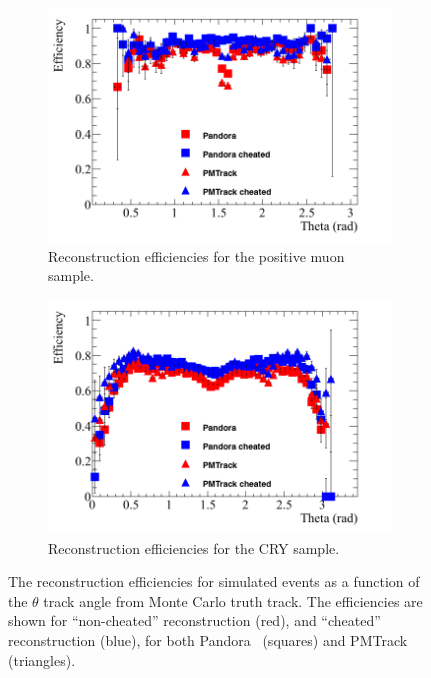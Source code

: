 \begin{figure}
  \centering
  \begin{subfigure}{0.48\textwidth}
    \centering
    \includegraphics[width=\textwidth]{Effic_AntiMuon_500V_All_Theta}
    \caption{Reconstruction efficiencies for the positive muon sample.}
    \label{fig:SimEffic_Theta_AMu}
  \end{subfigure}%
  \hspace{0.03\textwidth}%
  \begin{subfigure}{0.48\textwidth}
    \centering
    \includegraphics[width=\textwidth]{Effic_Cosmics_500V_All_Theta}
    \caption{Reconstruction efficiencies for the CRY sample.}
    \label{fig:SimEffic_Theta_CRY}
  \end{subfigure}
  \caption[The reconstruction efficiencies for simulated events as a function of the $\theta$ track angle from Monte Carlo truth track.]
          {The reconstruction efficiencies for simulated events as a function of the $\theta$ track angle from Monte Carlo truth track. The efficiencies are shown for ``non-cheated'' reconstruction (red), and ``cheated'' reconstruction (blue), for both Pandora~\citep{Pandora} (squares) and PMTrack~\citep{PMTrack} (triangles).}
          \label{fig:SimEffic_Theta}
\end{figure}

